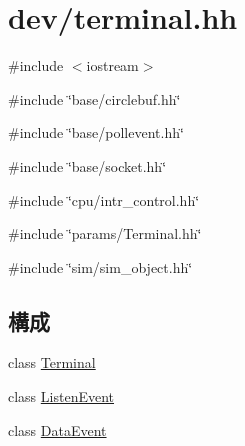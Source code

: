 \hypertarget{terminal_8hh}{
\section{dev/terminal.hh}
\label{terminal_8hh}
}
{\ttfamily \#include $<$iostream$>$}\par
{\ttfamily \#include \char`\"{}base/circlebuf.hh\char`\"{}}\par
{\ttfamily \#include \char`\"{}base/pollevent.hh\char`\"{}}\par
{\ttfamily \#include \char`\"{}base/socket.hh\char`\"{}}\par
{\ttfamily \#include \char`\"{}cpu/intr\_\-control.hh\char`\"{}}\par
{\ttfamily \#include \char`\"{}params/Terminal.hh\char`\"{}}\par
{\ttfamily \#include \char`\"{}sim/sim\_\-object.hh\char`\"{}}\par
\subsection*{構成}
\begin{DoxyCompactItemize}
\item 
class \hyperlink{classTerminal}{Terminal}
\item 
class \hyperlink{classTerminal_1_1ListenEvent}{ListenEvent}
\item 
class \hyperlink{classTerminal_1_1DataEvent}{DataEvent}
\end{DoxyCompactItemize}
